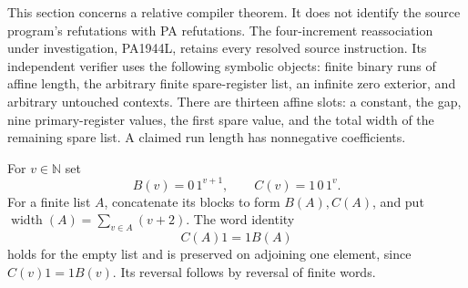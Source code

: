 \documentclass[11pt]{article}
\begin{document}
This section concerns a relative compiler theorem. It does not identify the
source program's refutations with PA refutations. The four-increment
reassociation under investigation, PA1944L, retains every resolved source
instruction. Its independent verifier uses the following symbolic objects:
finite binary runs of affine length, the arbitrary finite spare-register
list, an infinite zero exterior, and arbitrary untouched contexts. There
are thirteen affine slots: a constant, the gap, nine primary-register
values, the first spare value, and the total width of the remaining spare
list. A claimed run length has nonnegative coefficients.

For $v\in\mathbb N$ set
\[
 B(v)=0\,1^{v+1},\qquad C(v)=1\,0\,1^v.
\]
For a finite list $A$, concatenate its blocks to form $B(A),C(A)$, and put
$\operatorname{width}(A)=\sum_{v\in A}(v+2)$. The word identity
\[
 C(A)1=1B(A)
\]
holds for the empty list and is preserved on adjoining one element, since
$C(v)1=1B(v)$. Its reversal follows by reversal of finite words.
\end{document}

